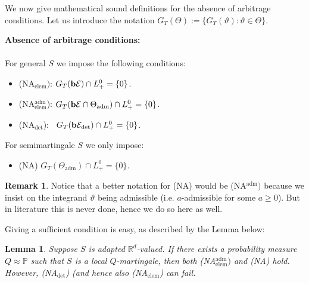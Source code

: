 \documentclass[12pt,a4paper, twoside]{article}
\newtheorem{lem}{Lemma}[section]
\theoremstyle{definition}
\newtheorem{rem}{Remark}[section]
\newcommand{\PP}{\mathbb{P}} %
\newcommand{\simple}{\textbf{\text{b}}\mathcal{E}}
\newcommand{\verysimple}{\textbf{\text{b}}\mathcal{E}_{\text{det}}}
\begin{document}
\newpage
We now give mathematical sound definitions for the absence of arbitrage conditions. Let us introduce the notation $G_T( \Theta):= \{ G_T( \vartheta) : \vartheta \in \Theta\}$.
\begin{mdframed}[backgroundcolor=yellow!20, topline=true, linewidth=2.0pt] \textbf{Absence of arbitrage conditions:}\\
\\
For general $S$ we impose the following conditions:
\begin{itemize}
\item (NA$_{\text{elem}})$: $G_T(\simple) \cap L_+^0 = \{ 0 \}$. 
\item (NA$_{\text{elem}}^\text{adm}$): $G_T(\simple \cap \Theta_\text{adm}) \cap L_+^0 = \{0\}$. 
\item (NA$_\text{det}$): \ $G_T(\verysimple) \cap L_+^0 = \{0\}$.
\end{itemize}
For semimartingale $S$ we only impose:
\begin{itemize}
\item (NA) $G_T( \Theta_\text{adm}) \cap L_+^0 = \{0 \}$. 
\end{itemize}
\end{mdframed}
\begin{rem} Notice that a better notation for (NA) would be (NA$^\text{adm})$ because we insist on the integrand $\vartheta$ being admissible (i.e. $a$-admissible for some $a \geq 0$). But in literature this is never done, hence we do so here as well. 
\end{rem}
Giving a sufficient condition is easy, as described by the Lemma below: 
\begin{lem} \label{L21} Suppose $S$ is adapted $\mathbb{R}^d$-valued. If there exists a probability measure $Q \approx \PP$ such that $S$ is a local $Q$-martingale, then both (NA$_\text{elem}^\text{adm})$ and (NA) hold. However, (NA$_\text{det}$) (and hence also (NA$_\text{elem}$) can fail. 
\end{lem}
\end{document}
